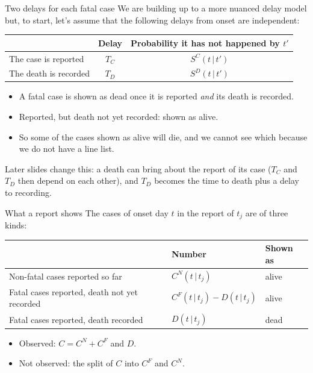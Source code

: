 \documentclass[aspectratio=169,9pt]{beamer}
\newcommand{\given}{\,|\,}
\begin{document}
\begin{frame}{Two delays for each fatal case}
We are building up to a more nuanced delay model but, to start, let's
assume that the following delays from onset are independent:

\smallskip
\begin{center}
\renewcommand{\arraystretch}{1.3}
\begin{tabular}{lcc}
\toprule
 & Delay & Probability it has not happened by $t'$ \\
\midrule
The case is reported & $T_C$ & $S^{C}(t\given t')$ \\
The death is recorded & $T_D$ & $S^{D}(t\given t')$ \\
\bottomrule
\end{tabular}
\end{center}

\medskip
\begin{itemize}
\item A fatal case is shown as dead once it is reported \emph{and}
its death is recorded.
\item Reported, but death not yet recorded: shown as alive.
\item So some of the cases shown as alive will die, and we cannot see which because we do
not have a line list.
\end{itemize}

\bigskip
Later slides change this: a death can bring about the report of its case
($T_C$ and $T_D$ then depend on each other), and $T_D$ becomes the time to death
plus a delay to recording.
\end{frame}

\begin{frame}{What a report shows}
The cases of onset day $t$ in the report of $t_j$ are of three kinds:

\medskip
\begin{center}
\renewcommand{\arraystretch}{1.4}
\begin{tabular}{lll}
\toprule
 & Number & Shown as \\
\midrule
Non-fatal cases reported so far & $C^{N}(t\given t_j)$ & alive \\
Fatal cases reported, death not yet recorded & $C^{F}(t\given t_j)-D(t\given t_j)$ & alive \\
Fatal cases reported, death recorded & $D(t\given t_j)$ & dead \\
\bottomrule
\end{tabular}
\end{center}

\bigskip
\begin{itemize}
\item Observed: $C=C^{N}+C^{F}$ and $D$.
\item Not observed: the split of $C$ into $C^{F}$ and $C^{N}$.
\end{itemize}
\end{frame}
\end{document}
